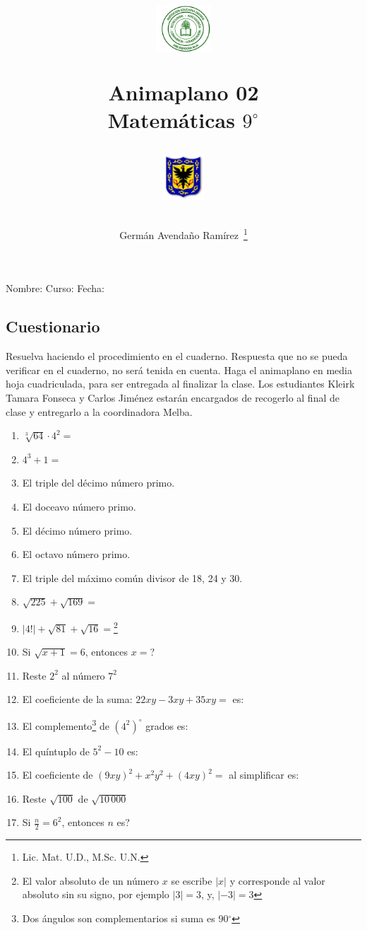 \documentclass[letterpaper,10pt,twoside]{article}
\author{Germ\'an Avenda\~no Ram\'irez~\thanks{Lic. Mat. U.D., M.Sc. U.N.}}
\title{\begin{minipage}{.2\textwidth}
\includegraphics[height=1.75cm]{Images/logo-colegio.png}\end{minipage}
\begin{minipage}{.55\textwidth}
\begin{center}
Animaplano 02\\
Matemáticas $9^{\circ}$
\end{center}
\end{minipage}\hfill
\begin{minipage}{.2\textwidth}
\includegraphics[height=1.75cm]{Images/logo-sed.png} 
\end{minipage}}
\date{}
\begin{document}
\maketitle
Nombre: \hrulefill Curso: \underline{\hspace*{44pt}} Fecha: \underline{\hspace*{2.5cm}}
\begin{multicols}{2}
\section*{Cuestionario}
Resuelva haciendo el procedimiento en el cuaderno. Respuesta que no se pueda verificar en el cuaderno, no será tenida en cuenta. Haga el animaplano en media hoja cuadriculada, para ser entregada al finalizar la clase. Los estudiantes Kleirk Tamara Fonseca y Carlos Jiménez estarán encargados de recogerlo al final de clase y entregarlo a la coordinadora Melba.
 \begin{enumerate}
 \item $\sqrt[3]{64}\cdot 4^{2}=$
 \item $4^{3}+1=$
 \item El triple del décimo número primo.
 \item El doceavo número primo.
 \item El décimo número primo.
 \item El octavo número primo.
 \item El triple del máximo común divisor de 18, 24 y 30.
 \item $\sqrt{225}+\sqrt{169}=$
 \item $|4!|+\sqrt{81}+\sqrt{16}=$\footnote{El valor absoluto de un número $x$ se escribe $|x|$ y corresponde al valor absoluto sin su signo, por ejemplo $|3|=3$, y, $|-3|=3$}
 \item Si $\sqrt{x+1}=6$, entonces $x=$?
 \item Reste $2^{2}$ al número $7^{2}$
 \item El coeficiente de la suma: $22xy-3xy+35xy=$ es:
 \item El complemento\footnote{Dos ángulos son complementarios si suma es 90$^{\circ}$} de $(4^{2})^{\circ}$ grados es:
 \item El quíntuplo de $5^{2}-10$ es:
 \item El coeficiente de $(9xy)^{2}+x^{2}y^{2}+(4xy)^{2}=$ al simplificar es:
 \item Reste $\sqrt{100}$ de $\sqrt{10\,000}$
 \item Si $\frac{n}{2}=6^{2}$, entonces $n$ es?

\end{enumerate}
\end{multicols}
\end{document}
